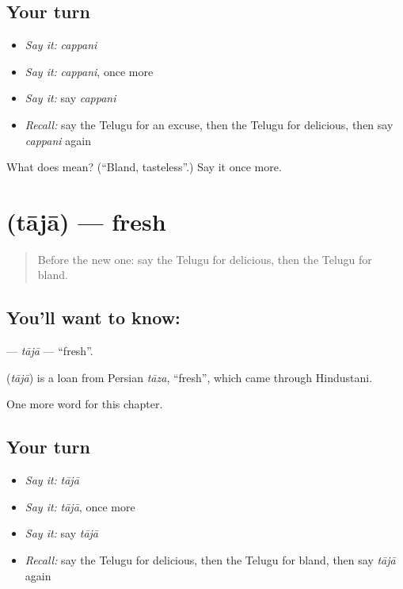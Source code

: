 \subsection*{Your turn}
\begin{itemize}
\raggedright
  \item \emph{Say it:} \emph{cappani}
  \item \emph{Say it:} \emph{cappani}, once more
  \item \emph{Say it:} say \emph{cappani}
  \item \emph{Recall:} say the Telugu for an excuse, then the Telugu for delicious, then say \emph{cappani} again
\end{itemize}

\begin{tcolorbox}[breakable,colback=teal!4,colframe=teal!35!black,title={Before you move on}]
What does  mean? (\textquotedblleft{}Bland, tasteless\textquotedblright{}.) Say it once more.
\end{tcolorbox}
\section[\texorpdfstring{\te{తాజా} (tājā)}{తాజా (tājā)}]{ (tājā) — fresh}

\label{lesson:TE-C179-taja}



\begin{quote}
Before the new one: say the Telugu for delicious, then the Telugu for bland.
\end{quote}

\subsection*{You'll want to know: }
\textbf{} — \emph{tājā} — \textquotedblleft{}fresh\textquotedblright{}.

\begin{cousinweb}
\textbf{} (\emph{tājā}) is a loan from Persian \emph{tāza}, \textquotedblleft{}fresh\textquotedblright{}, which came through Hindustani.
\end{cousinweb}

\begin{grammarlens}[title={What you've built}]
One more word for this chapter.
\end{grammarlens}

\subsection*{Your turn}
\begin{itemize}
\raggedright
  \item \emph{Say it:} \emph{tājā}
  \item \emph{Say it:} \emph{tājā}, once more
  \item \emph{Say it:} say \emph{tājā}
  \item \emph{Recall:} say the Telugu for delicious, then the Telugu for bland, then say \emph{tājā} again
\end{itemize}

